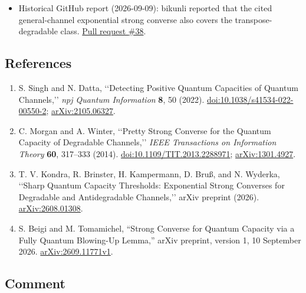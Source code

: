 \begin{itemize}
  \item Historical GitHub report (2026-09-09): bikunli reported that the cited general-channel exponential strong converse also covers the transpose-degradable class. \href{https://github.com/Naixu-Guo/quantum-open-problems/pull/38}{Pull request \#38}.
\end{itemize}

\subsection*{References}

\begin{enumerate}[label={},leftmargin=4.8em,labelsep=0.5em]
  \footnotesize
  \item[\textup{[SD22]}]\label{ref:p55-singh-datta}
  S. Singh and N. Datta,
  \lq\lq Detecting Positive Quantum Capacities of Quantum Channels,\rq\rq{}
  \emph{npj Quantum Information} \textbf{8}, 50 (2022).
  \href{https://doi.org/10.1038/s41534-022-00550-2}{doi:10.1038/s41534-022-00550-2};
  \href{https://arxiv.org/abs/2105.06327}{arXiv:2105.06327}.

  \item[\textup{[MW14]}]\label{ref:p55-morgan-winter}
  C. Morgan and A. Winter,
  \lq\lq Pretty Strong Converse for the Quantum Capacity of Degradable
  Channels,\rq\rq{} \emph{IEEE Transactions on Information Theory}
  \textbf{60}, 317--333 (2014).
  \href{https://doi.org/10.1109/TIT.2013.2288971}{doi:10.1109/TIT.2013.2288971};
  \href{https://arxiv.org/abs/1301.4927}{arXiv:1301.4927}.

  \item[\textup{[KBK+26]}]\label{ref:p55-kondra-et-al}
  T. V. Kondra, R. Brinster, H. Kampermann, D. Bru{\ss}, and N. Wyderka,
  \lq\lq Sharp Quantum Capacity Thresholds: Exponential Strong Converses for
  Degradable and Antidegradable Channels,\rq\rq{} arXiv preprint (2026).
  \href{https://arxiv.org/abs/2608.01308}{arXiv:2608.01308}.

  \item[\textup{[BT26]}]\label{ref:p55-beigi-tomamichel}
  S. Beigi and M. Tomamichel, ``Strong Converse for Quantum Capacity via a Fully Quantum Blowing-Up Lemma,'' arXiv preprint, version 1, 10 September 2026. \href{https://arxiv.org/abs/2609.11771v1}{arXiv:2609.11771v1}.
\end{enumerate}

\subsection*{Comment}

